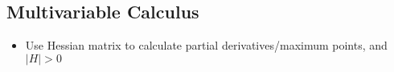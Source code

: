 \documentclass{article}
\begin{document}
\begin{multicols}{2}
\subsection{Multivariable Calculus}
\begin{itemize}
	\item Use Hessian matrix to calculate partial derivatives/maximum points, and $|H| > 0$
\end{itemize}
\end{multicols}
\end{document}
